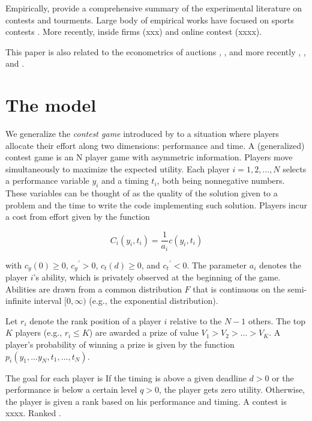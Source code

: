 \documentclass[12pt,]{article}
\begin{document}
Empirically, \citet{dechenaux2014survey} provide a comprehensive summary
of the experimental literature on contests and tourments. Large body of
empirical works have focused on sports contests
\citet{szymanski2003economic}. More recently, inside firms (xxx) and
online contest (xxxx).

This paper is also related to the econometrics of auctions
\citet{paarsch1992deciding}, \citet{laffont1995econometrics},
\citet{donald1996identification} and more recently
\citet{athey2011comparing}, \citet{athey2002identification}, and
\citet{athey2007nonparametric}.

\section{The model}\label{the-model}

We generalize the \emph{contest game} introduced by
\citet{moldovanu2001optimal} to a situation where players allocate their
effort along two dimensions: performance and time. A (generalized)
contest game is an N player game with asymmetric information. Players
move simultaneously to maximize the expected utility. Each player
\(i=1, 2, ..., N\) selects a performance variable \(y_i\) and a timing
\(t_i\), both being nonnegative numbers. These variables can be thought
of as the quality of the solution given to a problem and the time to
write the code implementing such solution. Players incur a cost from
effort given by the function

\begin{equation}
  C_i(y_i, t_i) = \frac{1}{a_i} c(y_i, t_i)
\end{equation}

with \({c_{y}}(0)\geq 0\), \({c_{y}}^\prime>0\), \({c_{t}}(d)\geq 0\),
and \({c_{t}}^\prime<0\). The parameter \(a_i\) denotes the player
\(i\)'s ability, which is privately observed at the beginning of the
game. Abilities are drawn from a common distribution \(F\) that is
continuous on the semi-infinite interval \([0,\infty)\) (e.g., the
exponential distribution).

Let \(r_i\) denote the rank position of a player \(i\) relative to the
\(N-1\) others. The top \(K\) players (e.g., \(r_i\leq K\)) are awarded
a prize of value \(V_1 > V_2 > ... > V_K\). A player's probability of
winning a prize is given by the function
\(p_i(y_1,...y_N, t_1, ..., t_N)\).

The goal for each player is If the timing is above a given deadline
\(d>0\) or the performance is below a certain level \(q>0\), the player
gets zero utility. Otherwise, the player is given a rank based on his
performance and timing. A contest is xxxx. Ranked .
\end{document}
